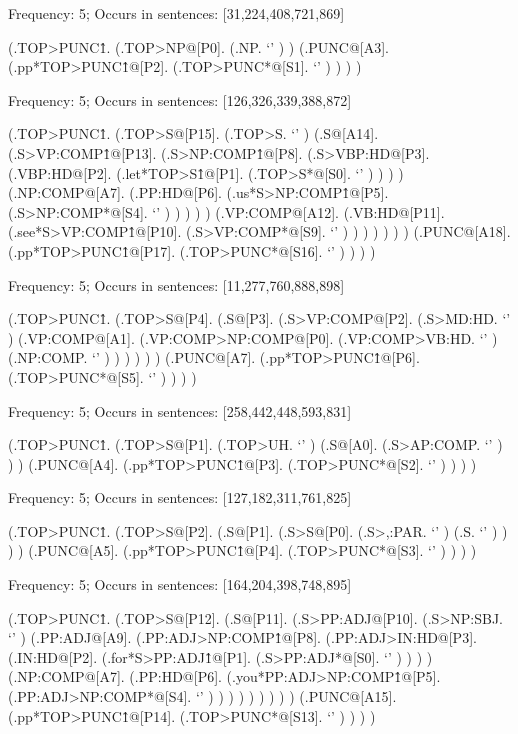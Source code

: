\documentclass[10pt]{article}
\begin{document}
Frequency: 5; Occurs in sentences: [31,224,408,721,869]


\begin{parsetree} (.TOP>PUNC\^1. (.TOP>NP@[P0]. (.NP. `' ) ) (.PUNC@[A3]. (.pp*TOP>PUNC\^1@[P2]. (.TOP>PUNC*@[S1]. `' ) ) ) ) \end{parsetree}

Frequency: 5; Occurs in sentences: [126,326,339,388,872]


\begin{parsetree} (.TOP>PUNC\^1. (.TOP>S@[P15]. (.TOP>S. `' ) (.S@[A14]. (.S>VP:COMP\^1@[P13]. (.S>NP:COMP\^1@[P8]. (.S>VBP:HD@[P3]. (.VBP:HD@[P2]. (.let*TOP>S\^1@[P1]. (.TOP>S*@[S0]. `' ) ) ) ) (.NP:COMP@[A7]. (.PP:HD@[P6]. (.us*S>NP:COMP\^1@[P5]. (.S>NP:COMP*@[S4]. `' ) ) ) ) ) (.VP:COMP@[A12]. (.VB:HD@[P11]. (.see*S>VP:COMP\^1@[P10]. (.S>VP:COMP*@[S9]. `' ) ) ) ) ) ) ) (.PUNC@[A18]. (.pp*TOP>PUNC\^1@[P17]. (.TOP>PUNC*@[S16]. `' ) ) ) ) \end{parsetree}

Frequency: 5; Occurs in sentences: [11,277,760,888,898]


\begin{parsetree} (.TOP>PUNC\^1. (.TOP>S@[P4]. (.S@[P3]. (.S>VP:COMP@[P2]. (.S>MD:HD. `' ) (.VP:COMP@[A1]. (.VP:COMP>NP:COMP@[P0]. (.VP:COMP>VB:HD. `' ) (.NP:COMP. `' ) ) ) ) ) ) (.PUNC@[A7]. (.pp*TOP>PUNC\^1@[P6]. (.TOP>PUNC*@[S5]. `' ) ) ) ) \end{parsetree}

Frequency: 5; Occurs in sentences: [258,442,448,593,831]


\begin{parsetree} (.TOP>PUNC\^1. (.TOP>S@[P1]. (.TOP>UH. `' ) (.S@[A0]. (.S>AP:COMP. `' ) ) ) (.PUNC@[A4]. (.pp*TOP>PUNC\^1@[P3]. (.TOP>PUNC*@[S2]. `' ) ) ) ) \end{parsetree}

Frequency: 5; Occurs in sentences: [127,182,311,761,825]


\begin{parsetree} (.TOP>PUNC\^1. (.TOP>S@[P2]. (.S@[P1]. (.S>S@[P0]. (.S>,:PAR. `' ) (.S. `' ) ) ) ) (.PUNC@[A5]. (.pp*TOP>PUNC\^1@[P4]. (.TOP>PUNC*@[S3]. `' ) ) ) ) \end{parsetree}

Frequency: 5; Occurs in sentences: [164,204,398,748,895]


\begin{parsetree} (.TOP>PUNC\^1. (.TOP>S@[P12]. (.S@[P11]. (.S>PP:ADJ@[P10]. (.S>NP:SBJ. `' ) (.PP:ADJ@[A9]. (.PP:ADJ>NP:COMP\^1@[P8]. (.PP:ADJ>IN:HD@[P3]. (.IN:HD@[P2]. (.for*S>PP:ADJ\^1@[P1]. (.S>PP:ADJ*@[S0]. `' ) ) ) ) (.NP:COMP@[A7]. (.PP:HD@[P6]. (.you*PP:ADJ>NP:COMP\^1@[P5]. (.PP:ADJ>NP:COMP*@[S4]. `' ) ) ) ) ) ) ) ) ) (.PUNC@[A15]. (.pp*TOP>PUNC\^1@[P14]. (.TOP>PUNC*@[S13]. `' ) ) ) ) \end{parsetree}
\end{document}
